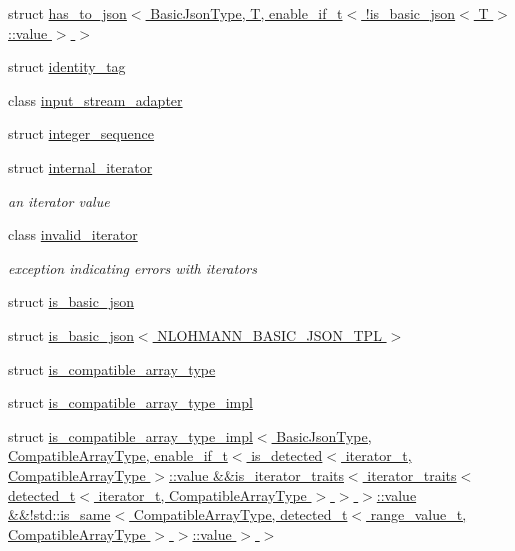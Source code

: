 \begin{DoxyCompactItemize}
\item 
struct \hyperlink{structnlohmann_1_1detail_1_1has__to__json_3_01BasicJsonType_00_01T_00_01enable__if__t_3_01_9is__4a8838c1c30336126696a126041e661c}{has\+\_\+to\+\_\+json$<$ Basic\+Json\+Type, T, enable\+\_\+if\+\_\+t$<$ !is\+\_\+basic\+\_\+json$<$ T $>$\+::value $>$ $>$}
\item 
struct \hyperlink{structnlohmann_1_1detail_1_1identity__tag}{identity\+\_\+tag}
\item 
class \hyperlink{classnlohmann_1_1detail_1_1input__stream__adapter}{input\+\_\+stream\+\_\+adapter}
\item 
struct \hyperlink{structnlohmann_1_1detail_1_1integer__sequence}{integer\+\_\+sequence}
\item 
struct \hyperlink{structnlohmann_1_1detail_1_1internal__iterator}{internal\+\_\+iterator}
\begin{DoxyCompactList}\small\item\em an iterator value \end{DoxyCompactList}\item 
class \hyperlink{classnlohmann_1_1detail_1_1invalid__iterator}{invalid\+\_\+iterator}
\begin{DoxyCompactList}\small\item\em exception indicating errors with iterators \end{DoxyCompactList}\item 
struct \hyperlink{structnlohmann_1_1detail_1_1is__basic__json}{is\+\_\+basic\+\_\+json}
\item 
struct \hyperlink{structnlohmann_1_1detail_1_1is__basic__json_3_01NLOHMANN__BASIC__JSON__TPL_01_4}{is\+\_\+basic\+\_\+json$<$ N\+L\+O\+H\+M\+A\+N\+N\+\_\+\+B\+A\+S\+I\+C\+\_\+\+J\+S\+O\+N\+\_\+\+T\+P\+L $>$}
\item 
struct \hyperlink{structnlohmann_1_1detail_1_1is__compatible__array__type}{is\+\_\+compatible\+\_\+array\+\_\+type}
\item 
struct \hyperlink{structnlohmann_1_1detail_1_1is__compatible__array__type__impl}{is\+\_\+compatible\+\_\+array\+\_\+type\+\_\+impl}
\item 
struct \hyperlink{structnlohmann_1_1detail_1_1is__compatible__array__type__impl_3_01BasicJsonType_00_01CompatibleAfaa3c0bd038fd031f5ee109e19639e03}{is\+\_\+compatible\+\_\+array\+\_\+type\+\_\+impl$<$ Basic\+Json\+Type, Compatible\+Array\+Type, enable\+\_\+if\+\_\+t$<$ is\+\_\+detected$<$ iterator\+\_\+t, Compatible\+Array\+Type $>$\+::value \&\&is\+\_\+iterator\+\_\+traits$<$ iterator\+\_\+traits$<$ detected\+\_\+t$<$ iterator\+\_\+t, Compatible\+Array\+Type $>$ $>$ $>$\+::value \&\&!std\+::is\+\_\+same$<$ Compatible\+Array\+Type, detected\+\_\+t$<$ range\+\_\+value\+\_\+t, Compatible\+Array\+Type $>$ $>$\+::value $>$ $>$}

\end{DoxyCompactItemize}
